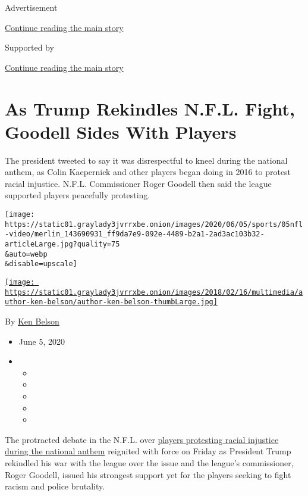 Advertisement

\protect\hyperlink{after-top}{Continue reading the main story}

Supported by

\protect\hyperlink{after-sponsor}{Continue reading the main story}

\hypertarget{as-trump-rekindles-nfl-fight-goodell-sides-with-players}{%
\section{As Trump Rekindles N.F.L. Fight, Goodell Sides With
Players}\label{as-trump-rekindles-nfl-fight-goodell-sides-with-players}}

The president tweeted to say it was disrespectful to kneel during the
national anthem, as Colin Kaepernick and other players began doing in
2016 to protest racial injustice. N.F.L. Commissioner Roger Goodell then
said the league supported players peacefully protesting.

\texttt{[image: https://static01.graylady3jvrrxbe.onion/images/2020/06/05/sports/05nfl-video/merlin\_143690931\_ff9da7e9-092e-4489-b2a1-2ad3ac103b32-articleLarge.jpg?quality=75\\\&auto=webp\\\&disable=upscale]}

\href{https://www.nytimes3xbfgragh.onion/by/ken-belson}{\texttt{[image: https://static01.graylady3jvrrxbe.onion/images/2018/02/16/multimedia/author-ken-belson/author-ken-belson-thumbLarge.jpg]}}

By \href{https://www.nytimes3xbfgragh.onion/by/ken-belson}{Ken Belson}

\begin{itemize}
\item
  June 5, 2020
\item
  \begin{itemize}
  \item
  \item
  \item
  \item
  \item
  \end{itemize}
\end{itemize}

The protracted debate in the N.F.L. over
\href{https://www.nytimes3xbfgragh.onion/2019/02/15/sports/nfl-colin-kaepernick-protests-timeline.html}{players
protesting racial injustice during the national anthem} reignited with
force on Friday as President Trump rekindled his war with the league
over the issue and the league's commissioner, Roger Goodell, issued his
strongest support yet for the players seeking to fight racism and police
brutality.

